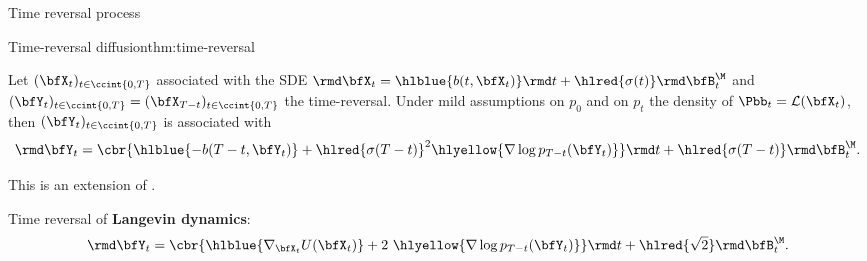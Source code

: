    \begin{frame}{Time reversal process}
   
   \begin{theorem}{Time-reversal diffusion}{thm:time-reversal}
     \label{thm:time_reversal_manifold}
   
       Let $(\bfX_t)_{t \in \ccint{0,T}}$ associated with the SDE
       $\rmd \bfX_t = \hlblue{b(t, \bfX_t)} \rmd t + \hlred{\sigma(t)} \rmd \bfB_t^\M$
       and $(\bfY_t)_{t \in \ccint{0,T}} = (\bfX_{T-t})_{t \in \ccint{0,T}}$ the time-reversal.
       Under mild assumptions on $p_0$ and on $p_t$ the density of $\Pbb_t=\mathcal{L}(\bfX_t)$, 
       then 
       $(\bfY_t)_{t \in \ccint{0,T}}$ is associated with
     \begin{equation}
       \label{eq:time_reversal_manifold}
     \rmd \bfY_t = \cbr{\hlblue{-b(T-t, \bfY_t)} + \hlred{\sigma(T-t)}^2 \hlyellow{\nabla \log p_{T-t}(\bfY_t)}} \rmd t + \hlred{\sigma(T-t)} \rmd \bfB_t^\M. 
     \end{equation}
   \end{theorem}
   This is an extension of \textcite[][Theorem 4.9]{cattiaux2021time}.
   \pause
   
   \vspace{.6em}
   Time reversal of \textbf{Langevin dynamics}:
   \begin{equation}
     \label{eq:langevin_reversal}
    \rmd \bfY_t = \cbr{\hlblue{\nabla_{\bfX_t} U(\bfX_t)} + 2~\hlyellow{\nabla \log p_{T-t}(\bfY_t)}} \rmd t + \hlred{\sqrt{2}} \rmd \bfB_t^\M.
   \end{equation}
   
   \end{frame}
   
